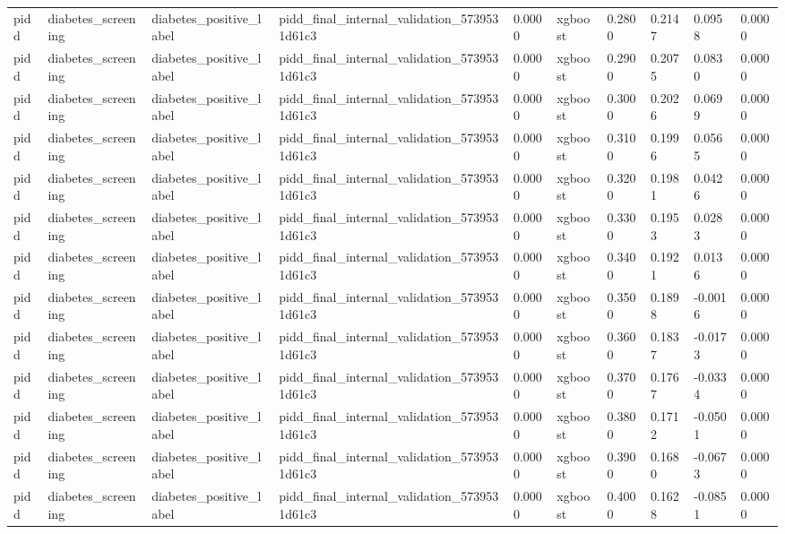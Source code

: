 \begin{tabular}{llllllllll}
pidd & diabetes\_screening & diabetes\_positive\_label & pidd\_final\_internal\_validation\_5739531d61c3 & 0.0000 & xgboost & 0.2800 & 0.2147 & 0.0958 & 0.0000 \\
pidd & diabetes\_screening & diabetes\_positive\_label & pidd\_final\_internal\_validation\_5739531d61c3 & 0.0000 & xgboost & 0.2900 & 0.2075 & 0.0830 & 0.0000 \\
pidd & diabetes\_screening & diabetes\_positive\_label & pidd\_final\_internal\_validation\_5739531d61c3 & 0.0000 & xgboost & 0.3000 & 0.2026 & 0.0699 & 0.0000 \\
pidd & diabetes\_screening & diabetes\_positive\_label & pidd\_final\_internal\_validation\_5739531d61c3 & 0.0000 & xgboost & 0.3100 & 0.1996 & 0.0565 & 0.0000 \\
pidd & diabetes\_screening & diabetes\_positive\_label & pidd\_final\_internal\_validation\_5739531d61c3 & 0.0000 & xgboost & 0.3200 & 0.1981 & 0.0426 & 0.0000 \\
pidd & diabetes\_screening & diabetes\_positive\_label & pidd\_final\_internal\_validation\_5739531d61c3 & 0.0000 & xgboost & 0.3300 & 0.1953 & 0.0283 & 0.0000 \\
pidd & diabetes\_screening & diabetes\_positive\_label & pidd\_final\_internal\_validation\_5739531d61c3 & 0.0000 & xgboost & 0.3400 & 0.1921 & 0.0136 & 0.0000 \\
pidd & diabetes\_screening & diabetes\_positive\_label & pidd\_final\_internal\_validation\_5739531d61c3 & 0.0000 & xgboost & 0.3500 & 0.1898 & -0.0016 & 0.0000 \\
pidd & diabetes\_screening & diabetes\_positive\_label & pidd\_final\_internal\_validation\_5739531d61c3 & 0.0000 & xgboost & 0.3600 & 0.1837 & -0.0173 & 0.0000 \\
pidd & diabetes\_screening & diabetes\_positive\_label & pidd\_final\_internal\_validation\_5739531d61c3 & 0.0000 & xgboost & 0.3700 & 0.1767 & -0.0334 & 0.0000 \\
pidd & diabetes\_screening & diabetes\_positive\_label & pidd\_final\_internal\_validation\_5739531d61c3 & 0.0000 & xgboost & 0.3800 & 0.1712 & -0.0501 & 0.0000 \\
pidd & diabetes\_screening & diabetes\_positive\_label & pidd\_final\_internal\_validation\_5739531d61c3 & 0.0000 & xgboost & 0.3900 & 0.1680 & -0.0673 & 0.0000 \\
pidd & diabetes\_screening & diabetes\_positive\_label & pidd\_final\_internal\_validation\_5739531d61c3 & 0.0000 & xgboost & 0.4000 & 0.1628 & -0.0851 & 0.0000 \\

\end{tabular}
